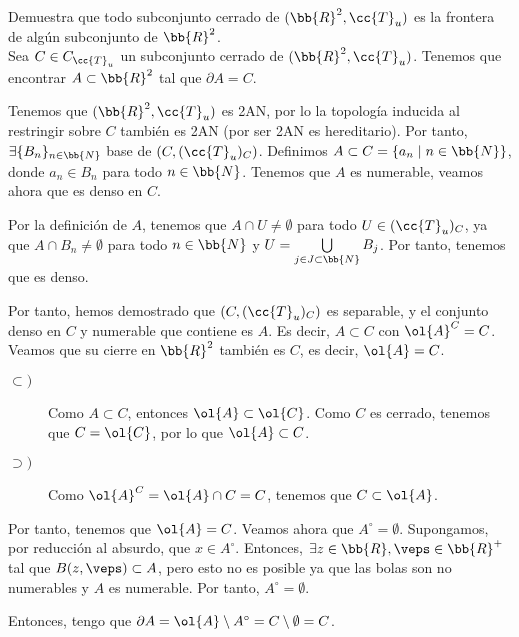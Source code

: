 \begin{ejercicio}
    Demuestra que todo subconjunto cerrado de $(\bb{R}^2, \cc{T}_u)$ es la frontera de algún subconjunto de $\bb{R}^2$.\\

    Sea $C\in C_{\cc{T}_u}$ un subconjunto cerrado de $(\bb{R}^2, \cc{T}_u)$. Tenemos que encontrar $A\subset  \bb{R}^2$ tal que $\partial A=C$.

    Tenemos que $(\bb{R}^2, \cc{T}_u)$ es 2AN, por lo la topología inducida al restringir sobre $C$ también es 2AN (por ser 2AN es hereditario). Por tanto, $\exists \{B_n\}_{n\in \bb{N}}$ base de $\left(C,(\cc{T}_u)_C\right)$. Definimos $A\subset C=\{a_n\mid n\in \bb{N}\}$, donde $a_n\in B_n$ para todo $n\in \bb{N}$. Tenemos que $A$ es numerable, veamos ahora que es denso en $C$.

    Por la definición de $A$, tenemos que $A\cap U\neq \emptyset$ para todo $U\in (\cc{T}_u)_C$, ya que $A\cap B_n\neq \emptyset$ para todo $n\in \bb{N}$ y $U=\bigcup\limits_{j\in J\subset \bb{N}}B_j$. Por tanto, tenemos que es denso.

    Por tanto, hemos demostrado que $\left(C,(\cc{T}_u)_C\right)$ es separable, y el conjunto denso en $C$ y numerable que contiene es $A$. Es decir, $A\subset C$ con $\ol{A}^C=C$. Veamos que su cierre en $\bb{R}^2$ también es $C$, es decir, $\ol{A}=C$.
    \begin{description}
        \item[$\subset)$] Como $A\subset C$, entonces $\ol{A}\subset \ol{C}$. Como $C$ es cerrado, tenemos que $C=\ol{C}$, por lo que $\ol{A}\subset C$.
        \item[$\supset)$]
        Como $\ol{A}^C=\ol{A}\cap C=C$, tenemos que $C\subset \ol{A}$.
    \end{description}
    
    Por tanto, tenemos que $\ol{A}= C$. Veamos ahora que $A^\circ = \emptyset$.
    Supongamos, por reducción al absurdo, que $x\in A^\circ$. Entonces, $\exists z\in \bb{R},\veps\in \bb{R}^+$ tal que $B(z,\veps)\subset A$, pero esto no es posible ya que las bolas son no numerables y $A$ es numerable. Por tanto, $A^\circ = \emptyset$.

    Entonces, tengo que $\partial A = \ol{A}\setminus A^\circ = C\setminus \emptyset = C$.
\end{ejercicio}

